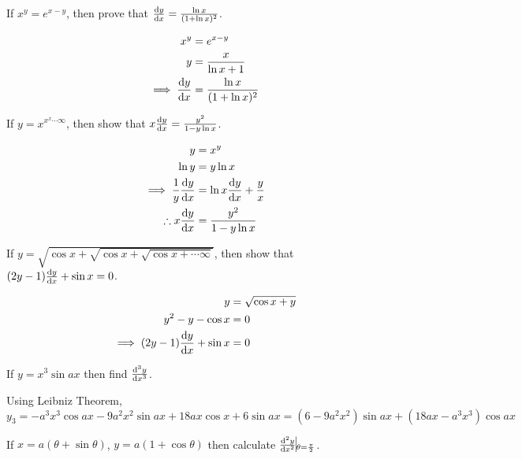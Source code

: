 \begin{asign}
	If $x^y=e^{x-y}$, then prove that $\dv{y}{x}=\frac{\ln x}{(1+\ln x)^2}$.
\end{asign}
\begin{anse}
	\[\begin{split}
		x^y&=e^{x-y}\\
		y&=\frac{x}{\ln x+1}\\
		\implies \dv{y}{x}&=\frac{\ln x}{(1+\ln x)^2}
	\end{split}\]
\end{anse}
\begin{asign}
	If $y=x^{x^x\cdots\infty}$, then show that $x\dv{y}{x}=\frac{y^2}{1-y\ln x}$.
\end{asign}
\begin{anse}
	\[\begin{split}
		y&=x^y\\
		\ln y&=y\ln x\\
		\implies \frac{1}{y}\dv{y}{x}&=\ln x\dv{y}{x}+\frac{y}{x}\\
		\therefore x\dv{y}{x}&=\frac{y^2}{1-y\ln x}
	\end{split}\]
\end{anse}
\begin{asign}
	If $y=\sqrt{\cos x+\sqrt{\cos x+\sqrt{\cos x+\cdots\infty}}}$, then show that $(2y-1)\dv{y}{x}+\sin x=0$.
\end{asign}
\begin{anse}
	\[\begin{split}
		y&=\sqrt{\cos x+y}\\
		y^2-y-\cos x&=0\\
		\implies (2y-1)\dv{y}{x}+\sin x&=0
	\end{split}\]
\end{anse}
\begin{asign}
	If $y=x^3\sin ax$ then find $\dv[3]{y}{x}$.
\end{asign}
\begin{anse}
	Using Leibniz Theorem,
	\[y_3=-a^3x^3\cos ax-9a^2x^2\sin ax+18ax\cos x+6\sin ax=(6-9a^2x^2)\sin ax+ (18ax-a^3x^3)\cos ax\]
\end{anse}
\begin{asign}
	If $x=a(\theta+\sin\theta)$, $y=a(1+\cos\theta)$ then calculate $\dv[2]{y}{x}\vline_{\theta=\frac{\pi}{2}}$.
\end{asign}
